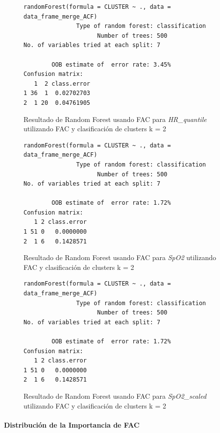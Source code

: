 \begin{figure}[H]
    \centering
    \begin{lstlisting}[frame=single, basicstyle=\small\ttfamily]
        randomForest(formula = CLUSTER ~ ., data = data_frame_merge_ACF) 
               Type of random forest: classification
                     Number of trees: 500
No. of variables tried at each split: 7

        OOB estimate of  error rate: 3.45%
Confusion matrix:
   1  2 class.error
1 36  1  0.02702703
2  1 20  0.04761905
    \end{lstlisting}
    \caption{Resultado de Random Forest usando FAC para \textit{HR\_quantile} utilizando FAC y clasificación de clusters k = 2}
    \label{fig:random_forest_acf_result_RF_3}
\end{figure}

\begin{figure}[H]
    \centering
    \begin{lstlisting}[frame=single, basicstyle=\small\ttfamily]
        randomForest(formula = CLUSTER ~ ., data = data_frame_merge_ACF) 
               Type of random forest: classification
                     Number of trees: 500
No. of variables tried at each split: 7

        OOB estimate of  error rate: 1.72%
Confusion matrix:
   1 2 class.error
1 51 0   0.0000000
2  1 6   0.1428571
    \end{lstlisting}
    \caption{Resultado de Random Forest usando FAC para \textit{SpO2} utilizando FAC y clasificación de clusters k = 2}\label{fig:random_forest_acf_result_RF_4}
\end{figure}
\begin{figure}[H]
    \centering
    \begin{lstlisting}[frame=single, basicstyle=\small\ttfamily]
        randomForest(formula = CLUSTER ~ ., data = data_frame_merge_ACF) 
               Type of random forest: classification
                     Number of trees: 500
No. of variables tried at each split: 7

        OOB estimate of  error rate: 1.72%
Confusion matrix:
   1 2 class.error
1 51 0   0.0000000
2  1 6   0.1428571
    \end{lstlisting}
    \caption{Resultado de Random Forest usando FAC para \textit{SpO2\_scaled} utilizando FAC y clasificación de clusters k = 2}
    \label{fig:random_forest_acf_result_RF_5}
\end{figure}

\paragraph{Distribución de la Importancia de FAC}

